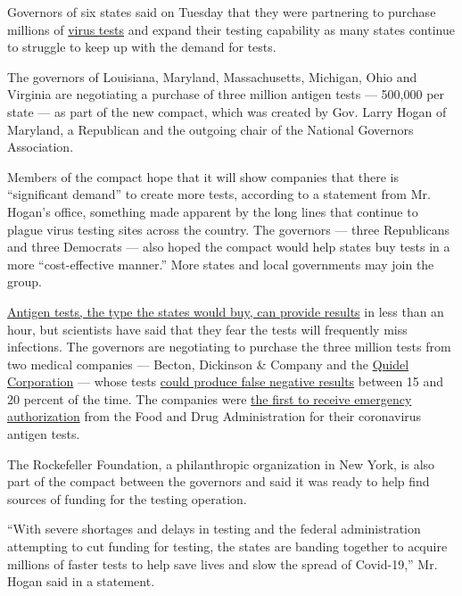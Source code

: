 Governors of six states said on Tuesday that they were partnering to
purchase millions of
\href{https://www.nytimes3xbfgragh.onion/2020/08/04/us/virus-testing-delays.html}{virus
tests} and expand their testing capability as many states continue to
struggle to keep up with the demand for tests.

The governors of Louisiana, Maryland, Massachusetts, Michigan, Ohio and
Virginia are negotiating a purchase of three million antigen tests ---
500,000 per state --- as part of the new compact, which was created by
Gov. Larry Hogan of Maryland, a Republican and the outgoing chair of the
National Governors Association.

Members of the compact hope that it will show companies that there is
``significant demand'' to create more tests, according to a statement
from Mr. Hogan's office, something made apparent by the long lines that
continue to plague virus testing sites across the country. The governors
--- three Republicans and three Democrats --- also hoped the compact
would help states buy tests in a more ``cost-effective manner.'' More
states and local governments may join the group.

\href{https://www.nytimes3xbfgragh.onion/2020/07/06/health/fast-coronavirus-tests.html}{Antigen
tests, the type the states would buy, can provide results} in less than
an hour, but scientists have said that they fear the tests will
frequently miss infections. The governors are negotiating to purchase
the three million tests from two medical companies --- Becton, Dickinson
\& Company and the
\href{https://www.nytimes3xbfgragh.onion/2020/05/09/health/antigen-testing-fda-coronavirus.html}{Quidel
Corporation} --- whose tests
\href{https://www.nytimes3xbfgragh.onion/2020/07/06/health/fast-coronavirus-tests.html}{could
produce false negative results} between 15 and 20 percent of the time.
The companies were
\href{https://www.nytimes3xbfgragh.onion/2020/07/06/health/fast-coronavirus-tests.html}{the
first to receive emergency authorization} from the Food and Drug
Administration for their coronavirus antigen tests.

The Rockefeller Foundation, a philanthropic organization in New York, is
also part of the compact between the governors and said it was ready to
help find sources of funding for the testing operation.

``With severe shortages and delays in testing and the federal
administration attempting to cut funding for testing, the states are
banding together to acquire millions of faster tests to help save lives
and slow the spread of Covid-19,'' Mr. Hogan said in a statement.

